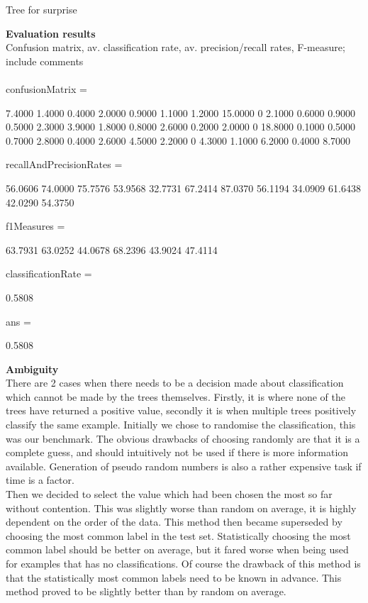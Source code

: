 \documentclass[12pt]{article}
\begin{document}
\begin{center}
  Tree for surprise
\end{center}


{\bf Evaluation results} \\
Confusion matrix, av. classification rate, av. precision/recall rates, F-measure; include comments \\ \\

          confusionMatrix =

          7.4000    1.4000    0.4000    2.0000    0.9000    1.1000
          1.2000   15.0000         0    2.1000    0.6000    0.9000
          0.5000    2.3000    3.9000    1.8000    0.8000    2.6000
          0.2000    2.0000         0   18.8000    0.1000    0.5000
          0.7000    2.8000    0.4000    2.6000    4.5000    2.2000
          0    4.3000    1.1000    6.2000    0.4000    8.7000


          recallAndPrecisionRates =

          56.0606   74.0000
          75.7576   53.9568
          32.7731   67.2414
          87.0370   56.1194
          34.0909   61.6438
          42.0290   54.3750


          f1Measures =

          63.7931
          63.0252
          44.0678
          68.2396
          43.9024
          47.4114


          classificationRate =

          0.5808


          ans =

          0.5808

{\bf Ambiguity} \\
There are 2 cases when there needs to be a decision made about classification which cannot be made by the trees themselves. Firstly, it is where none of the trees have returned a positive value, secondly it is when multiple trees positively classify the same example. Initially we chose to randomise the classification, this was our benchmark. The obvious drawbacks of choosing randomly are that it is a complete guess, and should intuitively not be used if there is more information available. Generation of pseudo random numbers is also a rather expensive task if time is a factor. \\

Then we decided to select the value which had been chosen the most so far without contention. This was slightly worse than random on average, it is highly dependent on the order of the data. This method then became superseded by choosing the most common label in the test set. Statistically choosing the most common label should be better on average, but it fared worse when being used for examples that has no classifications. Of course the drawback of this method is that the statistically most common labels need to be known in advance. This method proved to be slightly better than by random on average. \\
\end{document}
